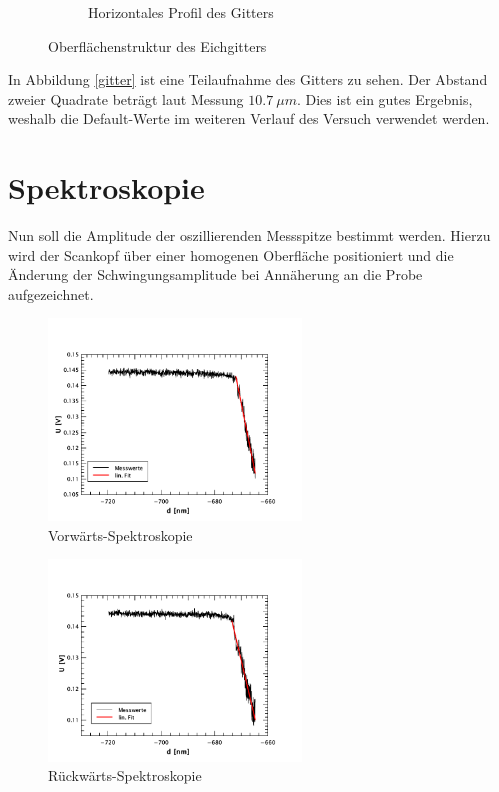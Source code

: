 \begin{figure}
\begin{subfigure}[hb]{0.4\textwidth}
        \caption{Horizontales Profil des Gitters}
    \end{subfigure}
    \caption{Oberflächenstruktur des Eichgitters}
\end{figure}
In Abbildung \ref{gitter} ist eine Teilaufnahme des Gitters zu sehen. Der Abstand 
zweier Quadrate beträgt laut Messung $\SI{10,7}{\mu m}$. Dies ist ein gutes 
Ergebnis, weshalb die Default-Werte im weiteren Verlauf des Versuch verwendet 
werden.

    \section{Spektroskopie}

Nun soll die Amplitude der oszillierenden Messspitze bestimmt werden. Hierzu wird
der Scankopf über einer homogenen Oberfläche positioniert und die Änderung der 
Schwingungsamplitude bei Annäherung an die Probe aufgezeichnet.
\begin{figure}[hp]
    \centering
    \includegraphics[width=0.6\textwidth]{Mess/spek_forw.pdf}
    \caption{Vorwärts-Spektroskopie}
    \label{spek_forw}
\end{figure}
\begin{figure}[hp]
    \centering
    \includegraphics[width=0.6\textwidth]{Mess/spek_backw.pdf}
    \caption{Rückwärts-Spektroskopie}
    \label{spek_backw}
\end{figure}
